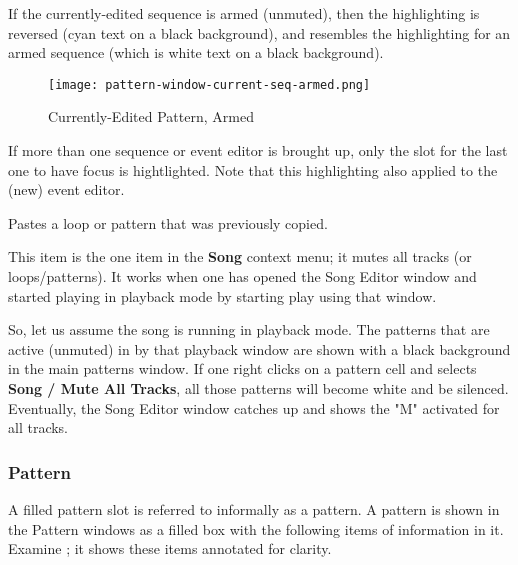    If the currently-edited sequence is armed (unmuted), then the highlighting
   is reversed (cyan text on a black background), and resembles the
   highlighting for an armed sequence (which is white text on a black
   background).

\begin{figure}[H]
   \centering 
   \texttt{[image: pattern-window-current-seq-armed.png]}
   \caption{Currently-Edited Pattern, Armed}
   \label{fig:pattern_window_current_seq_armed}
\end{figure}

   If more than one sequence or event editor is brought up, only the slot for
   the last one to have focus is hightlighted.
   Note that this highlighting also applied to the (new) event editor.

   Pastes a loop or pattern that was previously copied.

   This item is the one item in the \textbf{Song} context menu;
   it mutes all tracks (or loops/patterns).
   It works when one has opened the Song Editor window
   and started playing in playback
   mode by starting play using that window.

   So, let us assume the song is running in playback mode.  The patterns that
   are active (unmuted) in by that playback window are shown with a black
   background in the main patterns window.  If one right clicks on a pattern
   cell and selects \textbf{Song / Mute All Tracks}, all those patterns
   will become white and be silenced.  Eventually, the Song Editor window
   catches up and shows the "M" activated for all tracks.
   
\subsubsection{Pattern}
\label{subsubsec:seq64_patterns_pattern_filled}

   A filled pattern slot is referred to informally as a pattern.
   A pattern is shown in the Pattern windows as a filled box with the
   following items of information in it.
   Examine ; it shows
   these items annotated for clarity.

